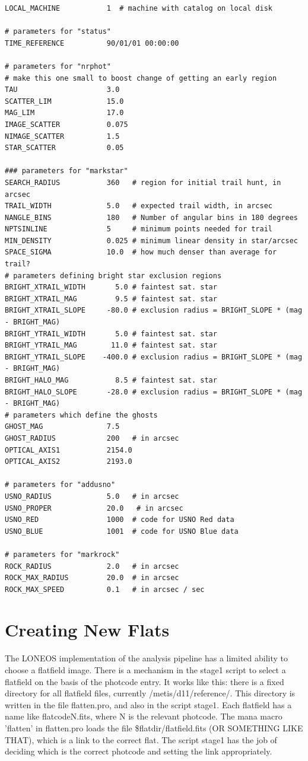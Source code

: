 \documentclass{article}
\begin{document}
\begin{verbatim}
LOCAL_MACHINE           1  # machine with catalog on local disk

# parameters for "status"
TIME_REFERENCE          90/01/01 00:00:00

# parameters for "nrphot"
# make this one small to boost change of getting an early region 
TAU                     3.0             
SCATTER_LIM             15.0
MAG_LIM                 17.0
IMAGE_SCATTER           0.075
NIMAGE_SCATTER          1.5
STAR_SCATTER            0.05

### parameters for "markstar"
SEARCH_RADIUS           360   # region for initial trail hunt, in arcsec 
TRAIL_WIDTH             5.0   # expected trail width, in arcsec
NANGLE_BINS             180   # Number of angular bins in 180 degrees
NPTSINLINE              5     # minimum points needed for trail
MIN_DENSITY             0.025 # minimum linear density in star/arcsec
SPACE_SIGMA             10.0  # how much denser than average for trail?
# parameters defining bright star exclusion regions
BRIGHT_XTRAIL_WIDTH       5.0 # faintest sat. star
BRIGHT_XTRAIL_MAG         9.5 # faintest sat. star
BRIGHT_XTRAIL_SLOPE     -80.0 # exclusion radius = BRIGHT_SLOPE * (mag - BRIGHT_MAG)
BRIGHT_YTRAIL_WIDTH       5.0 # faintest sat. star
BRIGHT_YTRAIL_MAG        11.0 # faintest sat. star
BRIGHT_YTRAIL_SLOPE    -400.0 # exclusion radius = BRIGHT_SLOPE * (mag - BRIGHT_MAG)
BRIGHT_HALO_MAG           8.5 # faintest sat. star
BRIGHT_HALO_SLOPE       -28.0 # exclusion radius = BRIGHT_SLOPE * (mag - BRIGHT_MAG)
# parameters which define the ghosts
GHOST_MAG               7.5
GHOST_RADIUS            200   # in arcsec
OPTICAL_AXIS1           2154.0
OPTICAL_AXIS2           2193.0

# parameters for "addusno"
USNO_RADIUS             5.0   # in arcsec
USNO_PROPER             20.0   # in arcsec
USNO_RED                1000  # code for USNO Red data
USNO_BLUE               1001  # code for USNO Blue data

# parameters for "markrock"
ROCK_RADIUS             2.0   # in arcsec
ROCK_MAX_RADIUS         20.0  # in arcsec
ROCK_MAX_SPEED          0.1   # in arcsec / sec
\end{verbatim}

\section{Creating New Flats}

The LONEOS implementation of the analysis pipeline has a limited
ability to choose a flatfield image.  There is a mechanism in the
stage1 script to select a flatfield on the basis of the photcode
entry.  It works like this:  there is a fixed directory for all
flatfield files, currently /metis/d11/reference/.  This directory is
written in the file flatten.pro, and also in the script stage1.  Each
flatfield has a name like flatcodeN.fits, where N is the relevant
photcode.  The mana macro 'flatten' in flatten.pro loads the file
\$flatdir/flatfield.fits (OR SOMETHING LIKE THAT), which is a link to
the correct flat.  The script stage1 has the job of deciding which is
the correct photcode and setting the link appropriately.
\end{document}
